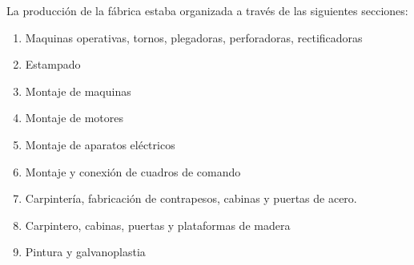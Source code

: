 \documentclass[a4paper,10pt,titlepage]{article}
\begin{document}
		\indent La producci\'on de la f\'abrica estaba organizada a trav\'es de las siguientes secciones:
		\begin{enumerate}
		 \item Maquinas operativas, tornos, plegadoras, perforadoras, rectificadoras
		 \item Estampado
		 \item Montaje de maquinas
		 \item Montaje de motores
		 \item Montaje de aparatos el\'ectricos
		 \item Montaje y conexi\'on de cuadros de comando
		 \item Carpinter\'ia, fabricaci\'on de contrapesos, cabinas y puertas de acero.
		 \item Carpintero, cabinas, puertas y plataformas de madera
		 \item Pintura y galvanoplastia
		\end{enumerate}
\end{document}

